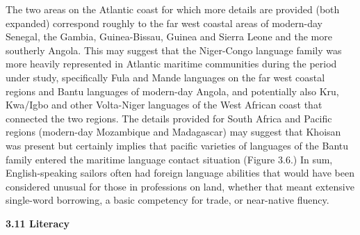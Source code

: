 \begin{styleStandard}
The two areas on the Atlantic coast for which more details are provided (both expanded) correspond roughly to the far west coastal areas of modern-day Senegal, the Gambia, Guinea-Bissau, Guinea and Sierra Leone and the more southerly Angola. This may suggest that the Niger-Congo language family was more heavily represented in Atlantic maritime communities during the period under study, specifically Fula and Mande languages on the far west coastal regions and Bantu languages of modern-day Angola, and potentially also Kru, Kwa/Igbo and other Volta-Niger languages of the West African coast that connected the two regions. The details provided for South Africa and Pacific regions (modern-day Mozambique and Madagascar) may suggest that Khoisan was present but certainly implies that pacific varieties of languages of the Bantu family entered the maritime language contact situation (Figure 3.6.) In sum, English-speaking sailors often had foreign language abilities that would have been considered unusual for those in professions on land, whether that meant extensive single-word borrowing, a basic competency for trade, or near-native fluency. 
\end{styleStandard}

\begin{styleStandard}
  [Warning: Image ignored] %
 
\end{styleStandard}

\begin{styleStandard}
\end{styleStandard}

\begin{styleStandard}
\textbf{3.11 Literacy}
\end{styleStandard}

